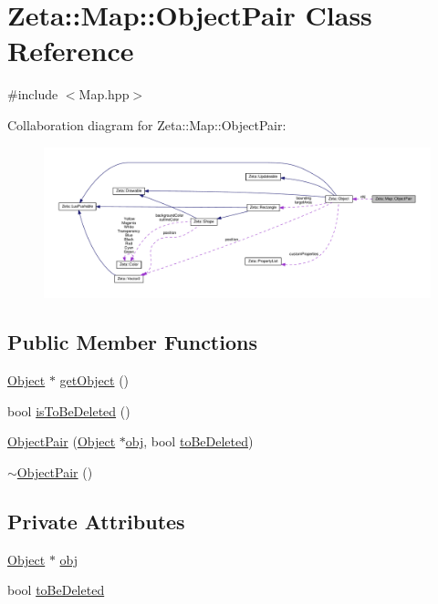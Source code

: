 \hypertarget{classZeta_1_1Map_1_1ObjectPair}{\section{Zeta\+:\+:Map\+:\+:Object\+Pair Class Reference}
\label{classZeta_1_1Map_1_1ObjectPair}
}


{\ttfamily \#include $<$Map.\+hpp$>$}



Collaboration diagram for Zeta\+:\+:Map\+:\+:Object\+Pair\+:\nopagebreak
\begin{figure}[H]
\begin{center}
\leavevmode
\includegraphics[width=350pt]{classZeta_1_1Map_1_1ObjectPair__coll__graph}
\end{center}
\end{figure}
\subsection*{Public Member Functions}
\begin{DoxyCompactItemize}
\item 
\hyperlink{classZeta_1_1Object}{Object} $\ast$ \hyperlink{classZeta_1_1Map_1_1ObjectPair_ab463107ec0102da7c40cc83056bfcee1}{get\+Object} ()
\item 
bool \hyperlink{classZeta_1_1Map_1_1ObjectPair_ae99860dfce764394d088116ddafdedf7}{is\+To\+Be\+Deleted} ()
\item 
\hyperlink{classZeta_1_1Map_1_1ObjectPair_a1a78b2cd9a82fb08e41c7e628ad6d9e5}{Object\+Pair} (\hyperlink{classZeta_1_1Object}{Object} $\ast$\hyperlink{classZeta_1_1Map_1_1ObjectPair_a381c6e43cf2fbc05383bcd3f3cb6067a}{obj}, bool \hyperlink{classZeta_1_1Map_1_1ObjectPair_a4ce67245e31ab1c72a52eb97c2e2ca8c}{to\+Be\+Deleted})
\item 
\hyperlink{classZeta_1_1Map_1_1ObjectPair_ae7e59b3420c4bf71ab3f88d383ca6ef0}{$\sim$\+Object\+Pair} ()
\end{DoxyCompactItemize}
\subsection*{Private Attributes}
\begin{DoxyCompactItemize}
\item 
\hyperlink{classZeta_1_1Object}{Object} $\ast$ \hyperlink{classZeta_1_1Map_1_1ObjectPair_a381c6e43cf2fbc05383bcd3f3cb6067a}{obj}
\item 
bool \hyperlink{classZeta_1_1Map_1_1ObjectPair_a4ce67245e31ab1c72a52eb97c2e2ca8c}{to\+Be\+Deleted}
\end{DoxyCompactItemize}


